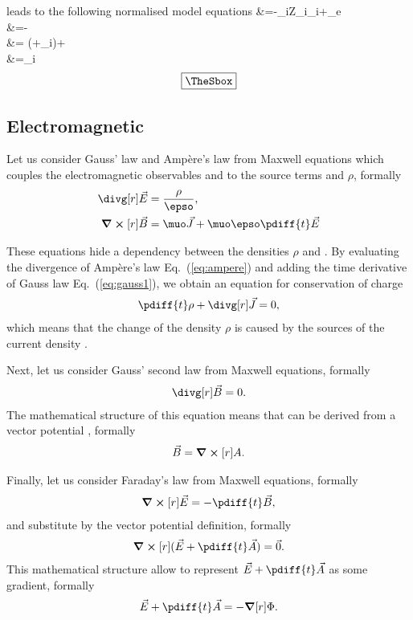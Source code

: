 \documentclass[10pt,a4paper]{article}
\newlength{\mylength}
\newenvironment{falign}%
{\setlength{\fboxsep}{15pt}
\setlength{\fboxrule}{0.5pt}
\setlength{\mylength}{\textwidth}
\addtolength{\mylength}{-2\fboxsep}
\addtolength{\mylength}{-2\fboxrule}
\Sbox
\minipage{\mylength}%
  \setlength{\abovedisplayskip}{-2\lineskip}
	\setlength{\belowdisplayskip}{-2\lineskip}
\align}%
{\endalign\endminipage\endSbox
\[\fbox{\TheSbox}\]}
\newcommand*{\Eq}[1]{Eq.~(#1)}
\begin{document}
leads to the following normalised model equations
\begin{falign}
\lapl[\xi]\phi&=-\sum_iZ_i\rho_i+\rho_e\exp{}\\
\vec{\epsilon}&=-\grad[\xi]{\phi}\\
&=
\left(\vec{\epsilon}+\vec{\psi}_i\cross\vec{\beta}\right)+
\vec{\zeta}\\
&=\vec{\psi}_i
\end{falign}

\subsection{Electromagnetic}

Let us consider Gauss' law and Ampère's law from Maxwell equations
which couples the electromagnetic observables  and  to the 
source terms  and $\rho$, formally
\begin{align}
\divg[r]\vec{E}&= \frac{\rho}{\epso},\label{eq:gauss1}\\
\curl[r]\vec{B}&=\muo\vec{J}+\muo\epso\pdiff{t}\vec{E}\label{eq:ampere}
\end{align}

These equations hide a dependency between the densities $\rho$ and . 
By evaluating the divergence of Ampère's law \Eq{\ref{eq:ampere}} and adding
the time derivative of Gauss law \Eq{\ref{eq:gauss1}}, we obtain
an equation for conservation of charge
\begin{align}
\pdiff{t}\rho + \divg[r]\vec{J} = 0,
\end{align}
which means that the change of the density $\rho$ is caused by the
sources of the current density .

Next, let us consider Gauss' second law from Maxwell equations, 
formally
\begin{align}
\divg[r]\vec{B}=0.\label{gauss2}
\end{align}
The mathematical structure of this equation means that  can be derived
from a vector potential , formally
\begin{align}
\vec{B}=\curl[r]{A}.\label{eq:rot}
\end{align}

Finally, let us consider Faraday's law from Maxwell equations, formally
\begin{align}
\curl[r]{\vec{E}}=-\pdiff{t}\vec{B},\label{eq:faraday}
\end{align}
and substitute  by the vector potential definition, formally
\begin{align}
\curl[r]{(\vec{E} + \pdiff{t}\vec{A})}=\vec{0}.
\end{align}
This mathematical
structure allow to represent $\vec{E} + \pdiff{t}\vec{A}$ as some gradient,
formally
\begin{align}
\vec{E} + \pdiff{t}\vec{A} = -\grad[r]{\Phi}.\label{eq:grad}
\end{align}
\end{document}
